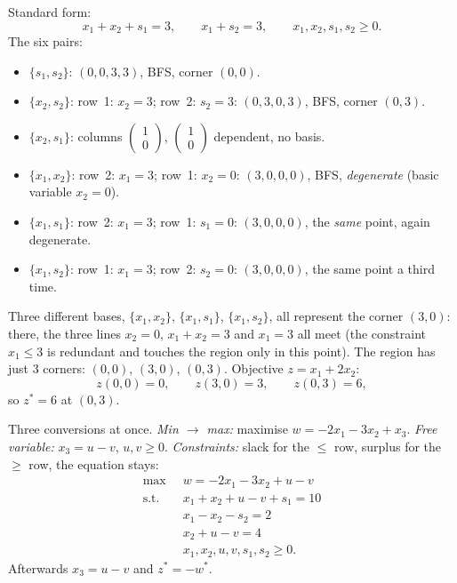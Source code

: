\begin{solutions}
  \item Standard form:
        \[
          x_{1}+x_{2}+s_{1}=3,\qquad
          x_{1}+s_{2}=3,\qquad
          x_{1},x_{2},s_{1},s_{2}\ge 0 .
        \]
        The six pairs:
        \begin{itemize}[leftmargin=1.8em,itemsep=0.3ex]
          \item $\{s_{1},s_{2}\}$: $(0,0,3,3)$, BFS, corner $(0,0)$.
          \item $\{x_{2},s_{2}\}$: row~1: $x_{2}=3$; row~2: $s_{2}=3$:
                $(0,3,0,3)$, BFS, corner $(0,3)$.
          \item $\{x_{2},s_{1}\}$: columns
                $\begin{pmatrix}1\\0\end{pmatrix}$,
                $\begin{pmatrix}1\\0\end{pmatrix}$ dependent, no basis.
          \item $\{x_{1},x_{2}\}$: row~2: $x_{1}=3$; row~1: $x_{2}=0$:
                $(3,0,0,0)$, BFS, \emph{degenerate} (basic variable
                $x_{2}=0$).
          \item $\{x_{1},s_{1}\}$: row~2: $x_{1}=3$; row~1: $s_{1}=0$:
                $(3,0,0,0)$, the \emph{same} point, again degenerate.
          \item $\{x_{1},s_{2}\}$: row~1: $x_{1}=3$; row~2: $s_{2}=0$:
                $(3,0,0,0)$, the same point a third time.
        \end{itemize}
        Three different bases, $\{x_{1},x_{2}\}$, $\{x_{1},s_{1}\}$,
        $\{x_{1},s_{2}\}$, all represent the corner $(3,0)$: there, the
        three lines $x_{2}=0$, $x_{1}+x_{2}=3$ and $x_{1}=3$ all meet
        (the constraint $x_{1}\le 3$ is redundant and touches the region
        only in this point). The region has just $3$ corners: $(0,0)$,
        $(3,0)$, $(0,3)$. Objective $z=x_{1}+2x_{2}$:
        \[
          z(0,0)=0,\qquad z(3,0)=3,\qquad z(0,3)=6 ,
        \]
        so $z^{*}=6$ at $(0,3)$.

  \item Three conversions at once. \emph{Min $\to$ max:} maximise
        $w=-2x_{1}-3x_{2}+x_{3}$. \emph{Free variable:}
        $x_{3}=u-v$, $u,v\ge 0$. \emph{Constraints:} slack for the
        $\le$ row, surplus for the $\ge$ row, the equation stays:
        \[
          \begin{aligned}
            \max\;\; & w=-2x_{1}-3x_{2}+u-v\\
            \text{s.t.}\;\; & x_{1}+x_{2}+u-v+s_{1}=10\\
            & x_{1}-x_{2}-s_{2}=2\\
            & x_{2}+u-v=4\\
            & x_{1},x_{2},u,v,s_{1},s_{2}\ge 0 .
          \end{aligned}
        \]
        Afterwards $x_{3}=u-v$ and $z^{*}=-w^{*}$.
\end{solutions}

